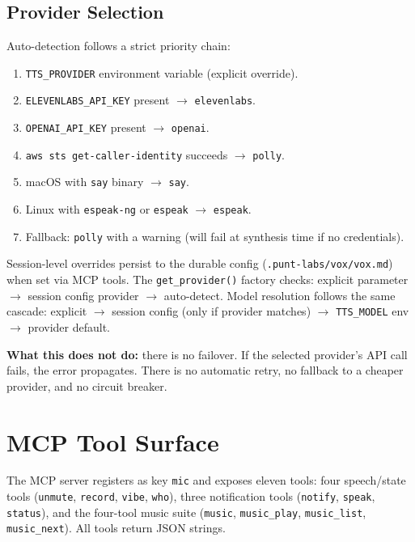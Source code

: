 \documentclass[a4paper,10pt]{article}
\newcommand{\tool}[1]{\texttt{#1}}
\begin{document}
\subsection{Provider Selection}

Auto-detection follows a strict priority chain:

\begin{enumerate}
  \item \texttt{TTS\_PROVIDER} environment variable (explicit
    override).
  \item \texttt{ELEVENLABS\_API\_KEY} present $\to$
    \texttt{elevenlabs}.
  \item \texttt{OPENAI\_API\_KEY} present $\to$ \texttt{openai}.
  \item \texttt{aws sts get-caller-identity} succeeds $\to$
    \texttt{polly}.
  \item macOS with \texttt{say} binary $\to$ \texttt{say}.
  \item Linux with \texttt{espeak-ng} or \texttt{espeak} $\to$
    \texttt{espeak}.
  \item Fallback: \texttt{polly} with a warning (will fail at
    synthesis time if no credentials).
\end{enumerate}

Session-level overrides persist to the durable config
(\texttt{.punt-labs/vox/vox.md}) when set via MCP tools.  The
\texttt{get\_provider()} factory checks:
explicit parameter $\to$ session config provider $\to$
auto-detect.  Model resolution follows the same cascade:
explicit $\to$ session config (only if provider matches) $\to$
\texttt{TTS\_MODEL} env $\to$ provider default.

\textbf{What this does not do:} there is no failover.  If the
selected provider's API call fails, the error propagates.  There
is no automatic retry, no fallback to a cheaper provider, and no
circuit breaker.


\section{MCP Tool Surface}
\label{sec:mcp}

The MCP server registers as key \texttt{mic} and exposes eleven
tools: four speech/state tools (\tool{unmute}, \tool{record},
\tool{vibe}, \tool{who}), three notification tools (\tool{notify},
\tool{speak}, \tool{status}), and the four-tool music suite
(\tool{music}, \tool{music\_play}, \tool{music\_list},
\tool{music\_next}).  All tools return JSON strings.
\end{document}
